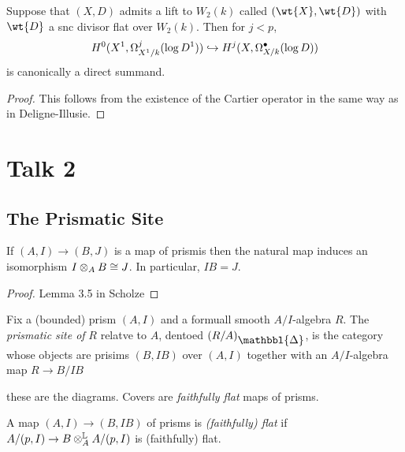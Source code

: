 \documentclass[12pt]{article}
\newcommand{\Prism}{{\mathlarger{\mathbbl{\Delta}}}}
\begin{document}
\begin{lemma}
Suppose that $(X, D)$ admits a lift to $W_2(k)$ called $(\wt{X}, \wt{D})$ with $\wt{D}$ a snc divisor flat over $W_2(k)$. Then for $j < p$,
\[ H^0(X^1, \Omega^j_{X^1/k}(\log{D^1})) \hookrightarrow H^j(X, \Omega^\bullet_{X/k}(\log{D})) \]
is canonically a direct summand. 
\end{lemma}

\begin{proof}
This follows from the existence of the Cartier operator in the same way as in Deligne-Illusie.
\end{proof}

\section{Talk 2}

\subsection{The Prismatic Site}

\newcommand{\barOpris}{\ol{\mathcal{O}}_{\Prism}}

\begin{lemma}
If $(A, I) \to (B,J)$ is a map of prismis then the natural map induces an isomorphism $I \otimes_A B \cong J$. In particular, $IB = J$.
\end{lemma}

\begin{proof}
{\color{red} Lemma 3.5 in Scholze}
\end{proof}

Fix a (bounded) prism $(A, I)$ and a formuall smooth $A/I$-algebra $R$. The \textit{prismatic site of} $R$ relatve to $A$, dentoed $(R/A)_{\Prism}$, is the category whose objects are prisims $(B, IB)$ over $(A,I)$ together with an $A/I$-algebra map $R \to B/IB$
\begin{center}
\end{center}
these are the diagrams. Covers are \textit{faithfully flat} maps of prisms.

\begin{defn}
A map $(A, I) \to (B, I B)$ of prisms is \textit{(faithfully) flat} if $A / (p, I) \to B \otimes_A^{\mathbb{L}} A / (p, I)$ is (faithfully) flat. 
\end{defn}
\end{document}

